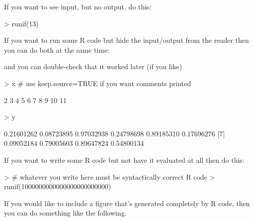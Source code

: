 \documentclass[12pt]{article}         %
\begin{document}
If you want to see input, but no output, do this:

\begin{Schunk}
\begin{Sinput}
> runif(13)
\end{Sinput}
\end{Schunk}

If you want to run some \textsf{R} code but hide the input/output from the reader then you can do both at the same time:


\bigskip   %

and you can double-check that it worked later (if you like)

\begin{Schunk}
\begin{Sinput}
> x  # use keep.source=TRUE if you want comments printed
\end{Sinput}
\begin{Soutput}
 [1]  2  3  4  5  6  7  8  9 10 11
\end{Soutput}
\begin{Sinput}
> y
\end{Sinput}
\begin{Soutput}
 [1] 0.21601262 0.08723895 0.97032938 0.24798698 0.89185310 0.17696276
 [7] 0.09052184 0.79005603 0.89647824 0.54800134
\end{Soutput}
\end{Schunk}

If you want to write some \textsf{R} code but not have it evaluated at all then do this:

\begin{Schunk}
\begin{Sinput}
> # whatever you write here must be syntactically correct R code
> runif(1000000000000000000000000)
\end{Sinput}
\end{Schunk}

If you would like to include a figure that's generated completely by \textsf{R} code, then you can do something like the following.
\end{document}
